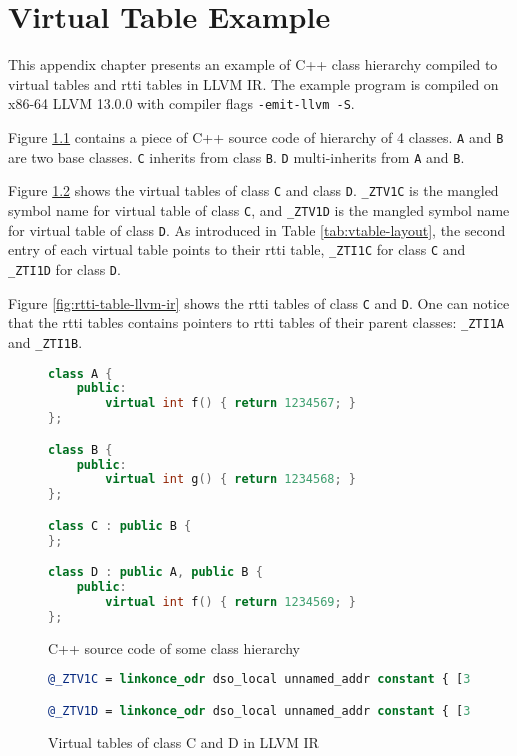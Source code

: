 \chapter{Virtual Table Example}
\label{appendix:vtable}

This appendix chapter presents an example of C++ class hierarchy compiled to virtual tables and \ac{rtti} tables in LLVM IR. The example program is compiled on x86-64 LLVM 13.0.0 with compiler flags \texttt{-emit-llvm -S}.

Figure \ref{fig:vtable-src} contains a piece of C++ source code of hierarchy of 4 classes. \texttt{A} and \texttt{B} are two base classes. \texttt{C} inherits from class \texttt{B}. \texttt{D} multi-inherits from \texttt{A} and \texttt{B}.

Figure \ref{fig:vtable-llvm-ir} shows the virtual tables of class \texttt{C} and class \texttt{D}. \texttt{\_ZTV1C} is the mangled symbol name for virtual table of class \texttt{C}, and \texttt{\_ZTV1D} is the mangled symbol name for virtual table of class \texttt{D}. As introduced in Table \ref{tab:vtable-layout}, the second entry of each virtual table points to their \ac{rtti} table, \texttt{\_ZTI1C} for class \texttt{C} and \texttt{\_ZTI1D} for class \texttt{D}.

Figure \ref{fig:rtti-table-llvm-ir} shows the \ac{rtti} tables of class \texttt{C} and \texttt{D}. One can notice that the \ac{rtti} tables contains pointers to \ac{rtti} tables of their parent classes: \texttt{\_ZTI1A} and \texttt{\_ZTI1B}.

\begin{figure}[H]
    \centering
    \begin{lstlisting}[language=c++]
class A {
    public:
        virtual int f() { return 1234567; }
};

class B {
    public:
        virtual int g() { return 1234568; }
};

class C : public B {
};

class D : public A, public B {
    public:
        virtual int f() { return 1234569; }
};
    \end{lstlisting}
    \caption{C++ source code of some class hierarchy}
    \label{fig:vtable-src}
\end{figure}

\begin{figure}[H]
    \begin{lstlisting}[language=llvm]
@_ZTV1C = linkonce_odr dso_local unnamed_addr constant { [3 x i8*] } { [3 x i8*] [i8* null, i8* bitcast ({ i8*, i8*, i8* }* @_ZTI1C to i8*), i8* bitcast (i32 (%class.B*)* @_ZN1B1gEv to i8*)] }, comdat, align 8

@_ZTV1D = linkonce_odr dso_local unnamed_addr constant { [3 x i8*], [3 x i8*] } { [3 x i8*] [i8* null, i8* bitcast ({ i8*, i8*, i32, i32, i8*, i64, i8*, i64 }* @_ZTI1D to i8*), i8* bitcast (i32 (%class.D*)* @_ZN1D1fEv to i8*)], [3 x i8*] [i8* inttoptr (i64 -8 to i8*), i8* bitcast ({ i8*, i8*, i32, i32, i8*, i64, i8*, i64 }* @_ZTI1D to i8*), i8* bitcast (i32 (%class.B*)* @_ZN1B1gEv to i8*)] }, comdat, align 8
    \end{lstlisting}
    \caption{Virtual tables of class C and D in LLVM IR}
    \label{fig:vtable-llvm-ir}
\end{figure}

